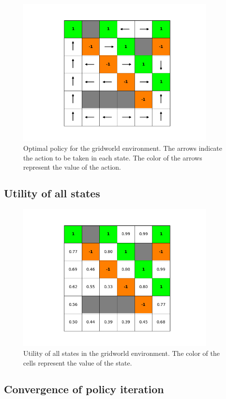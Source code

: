 \documentclass{article}
\begin{document}
\begin{figure}[H]
    \includegraphics[width=100mm]{../asset/policy_iteration_policy.png}
    \caption{Optimal policy for the gridworld environment. The arrows indicate the action to be taken in each state. The color of the arrows represent the value of the action.}
    \label{fig:policy_iteration_policy}
\end{figure}

\subsection{Utility of all states}

\begin{figure}[H]
    \includegraphics[width=100mm]{../asset/policy_iteration_utility.png}
    \caption{Utility of all states in the gridworld environment. The color of the cells represent the value of the state.}
    \label{fig:policy_iteration_utility}
\end{figure}

\subsection{Convergence of policy iteration}
\end{document}
